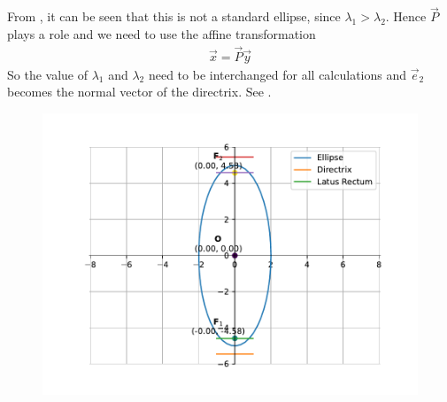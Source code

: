 From , it can be seen that this is not a standard ellipse, since $\lambda_1 > \lambda_2$.  Hence $\vec{P}$ plays a role and we need to use the affine transformation
\begin{align}
\vec{x} = \vec{P}\vec{y}
\end{align}
So the value of $\lambda_1$ and $\lambda_2$ need to be interchanged for all calculations and 
					$\vec{e}_2$ becomes the normal vector of the directrix.
See .
\begin{figure}[H]
	\begin{center} 
	    \includegraphics[width=0.75\columnwidth]{chapters/11/11/3/2/figs/fig.pdf}
	\end{center}
\caption{}
\label{fig:chapters/11/11/3/2/Fig1}
\end{figure}
